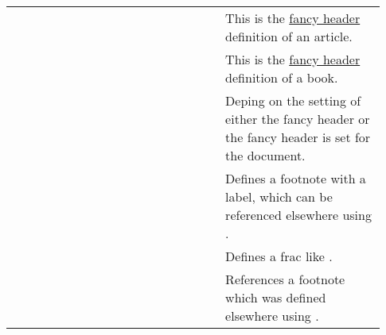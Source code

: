 \begin{footnotesize}
\begin{longtable}{ | P{0.53\linewidth} | p{0.4\linewidth} | }
        \tsDiameter{}                                                                                        \\
        \hline
                                                         &
        This is the \href{https://ctan.org/pkg/fancyhdr}{fancy header} definition of an article.             \\
        \hline
                                                            &
        This is the \href{https://ctan.org/pkg/fancyhdr}{fancy header} definition of a book.                 \\
        \hline
                            &
        Deping on the setting of  either the fancy
        header  or the fancy header
         is set for the document.                             \\
        \hline
                                               &
        Defines a footnote with
        a label, which can be referenced elsewhere using
        .                                                \\
        \hline
                                                     &
        Defines a frac like .                                                                   \\
        \hline
                                                       &
        References a footnote which was defined elsewhere
        using .                                  \\

\end{longtable}
\end{footnotesize}
